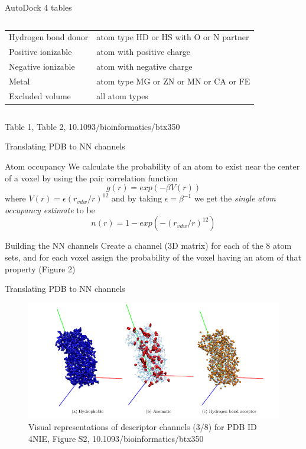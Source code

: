 \documentclass{beamer}
\begin{document}
\begin{frame}{AutoDock 4 tables}
\begin{columns}
\begin{column}{.6\textwidth}
\begin{tiny}
\begin{table}
\begin{tabular}{ l l }
        Hydrogen bond donor & atom type HD or HS with O or N partner \\
        Positive ionizable & atom with positive charge \\
        Negative ionizable & atom with negative charge \\
        Metal & atom type MG or ZN or MN or CA or FE \\
        Excluded volume & all atom types \\
      \end{tabular}
      \end{table}
      \end{tiny}
    \end{column}
  \end{columns}
  Table 1, Table 2, 10.1093/bioinformatics/btx350
\end{frame}

\begin{frame}{Translating PDB to NN channels}
  \begin{block}{Atom occupancy}
    We calculate the probability of an atom to exist near the center of a voxel by using the pair correlation function
    \[
      g(r) = exp(-\beta V(r))
    \]
    where $V(r) = \epsilon (r_{vdw}/r)^{12}$ and by taking $\epsilon = \beta^{-1}$ we get the \emph{single atom occupancy estimate} to be
    \[
      n(r) = 1 - exp(-(r_{vdw}/r)^{12})
    \]
  \end{block}
  \begin{block}{Building the NN channels}
    Create a channel (3D matrix) for each of the 8 atom sets, and for each voxel assign the probability of the voxel having an atom of that property (Figure 2)
  \end{block}
\end{frame}

\begin{frame}{Translating PDB to NN channels}
  \begin{figure}[h]
    \includegraphics[width=1\textwidth]{deepsite_protein_property_channels}
    \caption{Visual representations of descriptor channels (3/8) for PDB ID 4NIE, Figure S2, 10.1093/bioinformatics/btx350}
  \end{figure}
\end{frame}
\end{document}
